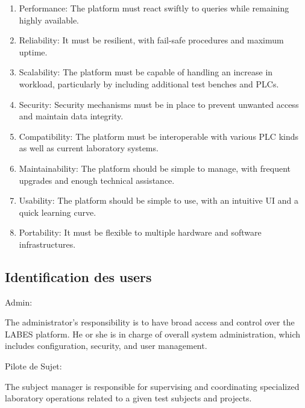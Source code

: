 \begin{enumerate}
\item

Performance: The platform must react swiftly to queries while remaining highly available.

\item
Reliability: It must be resilient, with fail-safe procedures and maximum uptime.

\item
Scalability: The platform must be capable of handling an increase in workload, particularly by including additional test benches and PLCs.

\item
Security:
Security mechanisms must be in place to prevent unwanted access and maintain data integrity.

\item
Compatibility: The platform must be interoperable with various PLC kinds as well as current laboratory systems.

\item
Maintainability: The platform should be simple to manage, with frequent upgrades and enough technical assistance.

\item
Usability: The platform should be simple to use, with an intuitive UI and a quick learning curve.

\item
Portability: It must be flexible to multiple hardware and software infrastructures.
\end{enumerate}

\subsection{Identification des users}
\begin{description}\item[Admin:]\end{description}  The administrator's responsibility is to have broad access and control over the LABES platform. He or she is in charge of overall system administration, which includes configuration, security, and user management.

\begin{description} \item[Pilote de Sujet:]\end{description}  The subject manager is responsible for supervising and coordinating specialized laboratory operations related to a given test subjects and projects.



